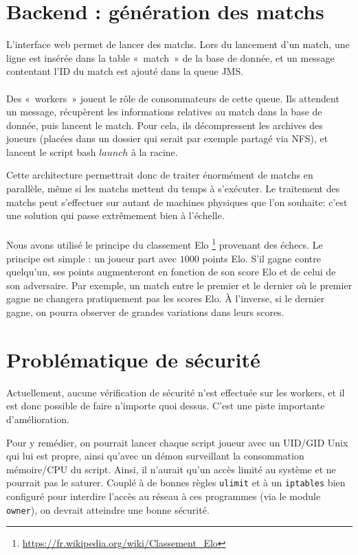 \documentclass[10pt]{scrartcl}
\begin{document}
\section{Backend : génération des matchs}
  L'interface web permet de lancer des matchs. Lors du lancement d'un
  match, une ligne est insérée dans la table «~match~» de la base de
  donnée, et un message contentant l'ID du match est ajouté dans la
  queue JMS.

  \paragraph{}
  Des «~workers~» jouent le rôle de consommateurs de cette queue. Ils
  attendent un message, récupèrent les informations relatives au match
  dans la base de donnée, puis lancent le match. Pour cela, ils décompressent
  les archives des joueurs (placées dans un dossier qui serait par exemple partagé
  via NFS), et lancent le script bash $launch$ à la racine.

  Cette architecture permettrait donc de traiter énormément de matchs en parallèle,
  même si les matchs mettent du temps à s'exécuter. Le traitement des matchs peut
  s'effectuer sur autant de machines physiques que l'on souhaite: c'est une solution
  qui passe extrêmement bien à l'échelle.

  \paragraph{}
  Nous avons utilisé le principe du classement Elo
  \footnote{\url{https://fr.wikipedia.org/wiki/Classement\_Elo}} provenant
  des échecs. Le principe est simple : un joueur part avec $1000$ points Elo.
  S'il gagne contre quelqu'un, ses points augmenteront en fonction de son
  score Elo et de celui de son adversaire. Par exemple, un match entre le
  premier et le dernier où le premier gagne ne changera pratiquement pas les
  scores Elo. À l'inverse, si le dernier gagne, on pourra observer de grandes
  variations dans leurs scores.

\section{Problématique de sécurité}
  Actuellement, aucune vérification de sécurité n'est effectuée sur les workers, et
  il est donc possible de faire n'importe quoi dessus.
  C'est une piste importante d'amélioration.

  Pour y remédier, on pourrait lancer chaque script joueur avec un UID/GID Unix qui lui est propre,
  ainsi qu'avec un démon surveillant la consommation mémoire/CPU du script. Ainsi, il n'aurait qu'un accès
  limité au système et ne pourrait pas le saturer. Couplé à de bonnes règles \verb+ulimit+ et à un \verb+iptables+ bien
  configuré pour interdire l'accès au réseau à ces programmes (via le module \verb+owner+), on devrait atteindre une
  bonne sécurité.
\end{document}
